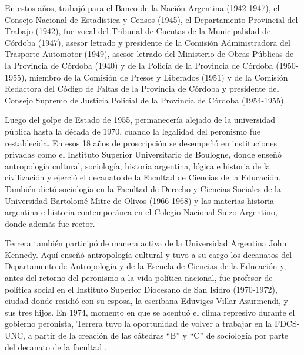 En estos años, trabajó para el Banco de la Nación Argentina (1942-1947), el Consejo Nacional de Estadística y Censos (1945), el Departamento Provincial del Trabajo (1942), fue vocal del Tribunal de Cuentas de la Municipalidad de Córdoba (1947), asesor letrado y presidente de la Comisión Administradora del Trasporte Automotor (1949), asesor letrado del Ministerio de Obras Públicas de la Provincia de Córdoba (1940) y de la Policía de la Provincia de Córdoba (1950-1955), miembro de la Comisión de Presos y Liberados (1951) y de la Comisión Redactora del Código de Faltas de la Provincia de Córdoba y presidente del Consejo Supremo de Justicia Policial de la Provincia de Córdoba (1954-1955).

Luego del golpe de Estado de 1955, permanecería alejado de la universidad pública hasta la década de 1970, cuando la legalidad del peronismo fue restablecida. En esos 18 años de proscripción se desempeñó en instituciones privadas como el Instituto Superior Universitario de Boulogne, donde enseñó antropología cultural, sociología, historia argentina, lógica e historia de la civilización y ejerció el decanato de la Facultad de Ciencias de la Educación. También dictó sociología en la Facultad de Derecho y Ciencias Sociales de la Universidad Bartolomé Mitre de Olivos (1966-1968) y las materias historia argentina e historia contemporánea en el Colegio Nacional Suizo-Argentino, donde además fue rector.

Terrera también participó de manera activa de la Universidad Argentina John Kennedy. Aquí enseñó antropología cultural y tuvo a su cargo los decanatos del Departamento de Antropología y de la Escuela de Ciencias de la Educación y, antes del retorno del peronismo a la vida política nacional, fue profesor de política social en el Instituto Superior Diocesano de San Isidro (1970-1972), ciudad donde residió con su esposa, la escribana Eduviges Villar Azurmendi, y sus tres hijos. En 1974, momento en que se acentuó el clima represivo durante el gobierno peronista, Terrera tuvo la oportunidad de volver a trabajar en la FDCS-UNC, a partir de la creación de las cátedras \enquote{B} y \enquote{C} de sociología por parte del decanato de la facultad \parencite{1558-CHAMORROGRECA2007}.

